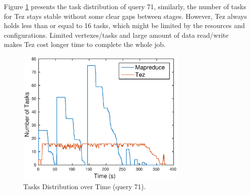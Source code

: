 \documentclass[10pt]{article}
\begin{document}
Figure \ref{fig:q1c_tasks_71} presents the task distribution of query 71, similarly, the number of tasks for Tez stays stable without some clear gaps between stages. However, Tez always holds less than or equal to 16 tasks, which might be limited by the resources and configurations. Limited vertexes/tasks and large amount of data read/write makes Tez cost longer time to complete the whole job.

\begin{figure}
\begin{center}
\includegraphics[width=0.75\textwidth]{pic/q1c_task_distribution_71}
\caption{Tasks Distribution over Time (query 71).}
\label{fig:q1c_tasks_71}
\end{center}
\end{figure}
\end{document}
